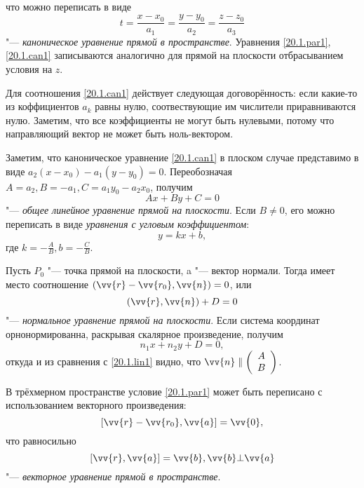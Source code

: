 что можно переписать в виде
\begin{equation}\label{20.1.can1}
t=\frac{x-x_0}{a_1}=\frac{y-y_0}{a_2}=\frac{z-z_0}{a_3}
\end{equation}
"--- \textit{каноническое уравнение прямой в пространстве}.
  Уравнения \eqref{20.1.par1}, \eqref{20.1.can1} записываются аналогично для прямой на плоскости отбрасыванием условия на $z$.
  \begin{notion}
  Для соотношения \eqref{20.1.can1} действует следующая договорённость: если какие-то из коффициентов $a_k$ равны нулю, соотвествующие им числители приравниваются нулю. Заметим, что все коэффициенты не могут быть нулевыми, потому что направляющий вектор не может быть ноль-вектором.
  \end{notion}
  
Заметим, что каноническое уравнение \eqref{20.1.can1} в плоском случае представимо в виде $a_2(x-x_0)-a_1(y-y_0)=0$. Переобозначая $A=a_2, B=-a_1, C=a_1y_0-a_2x_0$, получим
  \begin{equation}\label{20.1.lin1}
  Ax+By+C=0
  \end{equation}
  "--- \textit{общее линейное уравнение прямой на плоскости}. Если $B\neq0$, его можно переписать в виде \textit{уравнения с угловым коэффициентом}:
  \begin{equation}\label{20.1.ang1}
  y=kx+b,
  \end{equation}
  где $k=-\frac AB, b=-\frac CB$.
    
  Пусть $P_0$ "--- точка прямой на плоскости, a  "--- вектор нормали. Тогда имеет место соотношение $(\vv{r}-\vv{r_0},\vv{n})=0$, или
  \begin{equation}\label{20.1.norm1}
  (\vv{r},\vv{n})+D=0
  \end{equation}
  "--- \textit{нормальное уравнение прямой на плоскости}. Если система координат орнонормированна, раскрывая скалярное произведение, получим
  \begin{equation}
  n_1x+n_2y+D=0,
  \end{equation}
откуда и из сравнения с \eqref{20.1.lin1} видно, что $\vv{n}\parallel\left(\begin{array}{crl}
A\\
B
\end{array}\right)$.   

  В трёхмерном пространстве условие \eqref{20.1.par1} может быть переписано с использованием векторного произведения:
  \begin{equation}\label{20.1.vect1}
  [\vv{r}-\vv{r_0},\vv{a}]=\vv{0}, 
  \end{equation}
  что равносильно
  \begin{equation}\label{20.1.vect2}
  [\vv{r},\vv{a}]=\vv{b}, \vv{b}\bot\vv{a}
  \end{equation}
  "--- \textit{векторное уравнение прямой в пространстве}.
  
